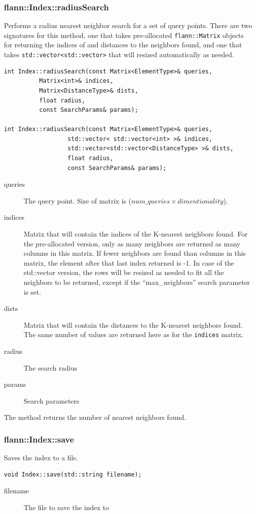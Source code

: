 \documentclass[letter,10pt]{article}
\begin{document}
\subsubsection{flann::Index::radiusSearch}
Performs a radius nearest neighbor search for a set of query points. There are two signatures for this method,
one that takes pre-allocated \texttt{flann::Matrix} objects for returning the indices of and distances to the neighbors
found, and one that takes \texttt{std::vector<std::vector>} that will resized automatically as needed.
\begin{Verbatim}[fontsize=\footnotesize,frame=single]
int Index::radiusSearch(const Matrix<ElementType>& queries,
		  Matrix<int>& indices,
		  Matrix<DistanceType>& dists,
		  float radius,
		  const SearchParams& params); 

int Index::radiusSearch(const Matrix<ElementType>& queries,
                  std::vector< std::vector<int> >& indices,
                  std::vector<std::vector<DistanceType> >& dists,
                  float radius,
                  const SearchParams& params);
\end{Verbatim}

\begin{description}
\item[queries]{The query point. Size of matrix is ($num\_queries \times dimentionality $).}
\item[indices]{Matrix that will contain the indices of the K-nearest neighbors found. For the pre-allocated version,
only as many neighbors are returned as many columns in this matrix. If fewer neighbors are found than
columns in this matrix, the element after that last index returned is -1. In case of the std::vector version, the rows
will be resized as needed to fit all the neighbors to be returned, except if the ``max\_neighbors'' search parameter is
set.}
\item[dists]{Matrix that will contain the distances to the K-nearest neighbors found. The same number of values are
returned here as for the \texttt{indices} matrix.}
\item[radius]{The search radius}
\item[params]{Search parameters}
\end{description}
The method returns the number of nearest neighbors found.


\subsubsection{flann::Index::save}
Saves the index to a file.
\begin{Verbatim}[fontsize=\footnotesize,frame=single]
  void Index::save(std::string filename);
\end{Verbatim}
\begin{description}
\item[filename]{The file to save the index to}
\end{description}
\end{document}
